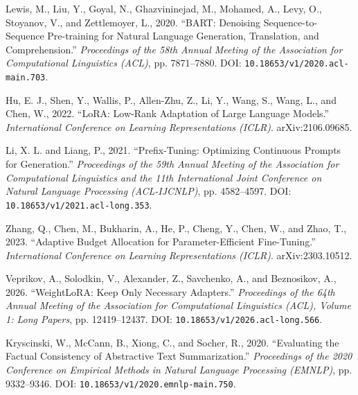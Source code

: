 \documentclass[11pt, letterpaper]{article}
\begin{document}
\begin{enumerate}[label={[\arabic*]},leftmargin=*]

\item
Lewis, M., Liu, Y., Goyal, N., Ghazvininejad, M., Mohamed, A.,
Levy, O., Stoyanov, V., and Zettlemoyer, L., 2020.
``BART: Denoising Sequence-to-Sequence Pre-training for Natural Language
Generation, Translation, and Comprehension.''
\textit{Proceedings of the 58th Annual Meeting of the Association for
Computational Linguistics (ACL)}, pp. 7871--7880.
DOI: \nolinkurl{10.18653/v1/2020.acl-main.703}.

\item
Hu, E. J., Shen, Y., Wallis, P., Allen-Zhu, Z., Li, Y., Wang, S.,
Wang, L., and Chen, W., 2022.
``LoRA: Low-Rank Adaptation of Large Language Models.''
\textit{International Conference on Learning Representations (ICLR)}.
arXiv:2106.09685.

\item
Li, X. L. and Liang, P., 2021.
``Prefix-Tuning: Optimizing Continuous Prompts for Generation.''
\textit{Proceedings of the 59th Annual Meeting of the Association for
Computational Linguistics and the 11th International Joint Conference on
Natural Language Processing (ACL-IJCNLP)}, pp. 4582--4597.
DOI: \nolinkurl{10.18653/v1/2021.acl-long.353}.

\item
Zhang, Q., Chen, M., Bukharin, A., He, P., Cheng, Y., Chen, W.,
and Zhao, T., 2023.
``Adaptive Budget Allocation for Parameter-Efficient Fine-Tuning.''
\textit{International Conference on Learning Representations (ICLR)}.
arXiv:2303.10512.

\item
Veprikov, A., Solodkin, V., Alexander, Z., Savchenko, A.,
and Beznosikov, A., 2026.
``WeightLoRA: Keep Only Necessary Adapters.''
\textit{Proceedings of the 64th Annual Meeting of the Association for
Computational Linguistics (ACL), Volume 1: Long Papers},
pp. 12419--12437.
DOI: \nolinkurl{10.18653/v1/2026.acl-long.566}.

\item
Kryscinski, W., McCann, B., Xiong, C., and Socher, R., 2020.
``Evaluating the Factual Consistency of Abstractive Text Summarization.''
\textit{Proceedings of the 2020 Conference on Empirical Methods in
Natural Language Processing (EMNLP)}, pp. 9332--9346.
DOI: \nolinkurl{10.18653/v1/2020.emnlp-main.750}.

\end{enumerate}
\end{document}
